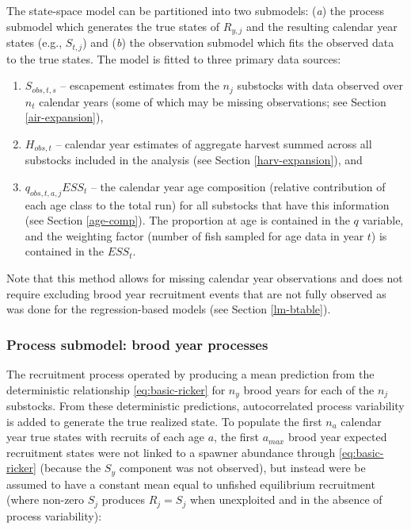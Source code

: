 \documentclass[12pt,]{book}
\theoremstyle{definition}
\theoremstyle{definition}
\theoremstyle{definition}
\theoremstyle{remark}
\begin{document}
The state-space model can be partitioned into two submodels: (\emph{a})
the process submodel which generates the true states of \(R_{y,j}\) and
the resulting calendar year states (e.g., \(S_{t,j}\)) and (\emph{b})
the observation submodel which fits the observed data to the true
states. The model is fitted to three primary data sources:

\begin{enumerate}
\def\labelenumi{(\arabic{enumi})}
\item
  \(S_{obs,t,s}\) -- escapement estimates from the \(n_j\) substocks
  with data observed over \(n_t\) calendar years (some of which may be
  missing observations; see Section \ref{air-expansion}),
\item
  \(H_{obs,t}\) -- calendar year estimates of aggregate harvest summed
  across all substocks included in the analysis (see Section
  \ref{harv-expansion}), and
\item
  \(q_{obs,t,a,j} ESS_t\) -- the calendar year age composition (relative
  contribution of each age class to the total run) for all substocks
  that have this information (see Section \ref{age-comp}). The
  proportion at age is contained in the \(q\) variable, and the
  weighting factor (number of fish sampled for age data in year \(t\))
  is contained in the \(ESS_t\).
\end{enumerate}

\noindent
Note that this method allows for missing calendar year observations and
does not require excluding brood year recruitment events that are not
fully observed as was done for the regression-based models (see Section
\ref{lm-btable}).

\subsubsection{Process submodel: brood year
processes}\label{ssm-bproc-model}

\noindent
The recruitment process operated by producing a mean prediction from the
deterministic \citet{ricker-1954} relationship \eqref{eq:basic-ricker} for
\(n_y\) brood years for each of the \(n_j\) substocks. From these
deterministic predictions, autocorrelated process variability is added
to generate the true realized state. To populate the first \(n_a\)
calendar year true states with recruits of each age \(a\), the first
\(a_{max}\) brood year expected recruitment states were not linked to a
spawner abundance through \eqref{eq:basic-ricker} (because the \(S_y\)
component was not observed), but instead were be assumed to have a
constant mean equal to unfished equilibrium recruitment (where non-zero
\(S_j\) produces \(R_j = S_j\) when unexploited and in the absence of
process variability):
\end{document}
